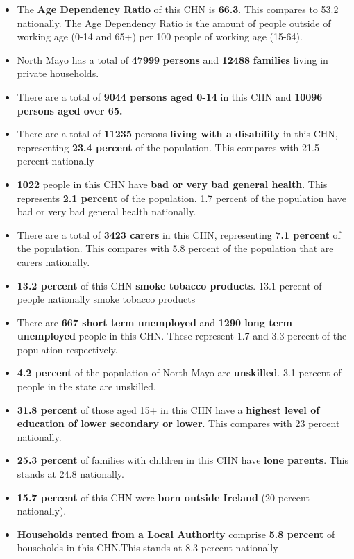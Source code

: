 \documentclass{article}
\begin{document}
\begin{itemize}

\item The \textbf{Age Dependency Ratio} of this CHN is  \textbf{66.3}. This compares to 53.2 nationally. The Age Dependency Ratio is the amount of people outside of working age (0-14 and 65+) per 100 people of working age (15-64). 

\item North Mayo has a total of \textbf{\num{47999}} \textbf{persons} and  \textbf{\num{12488}} \textbf{families} living in private households.

\item There are a total of \textbf{\num{9044} persons aged 0-14} in this CHN and \textbf{\num{10096} persons aged over 65.} 

\item There are a total of \textbf{\num{11235}} persons \textbf{living with a disability} in this CHN, representing \textbf{23.4 percent} of the population. This compares with  21.5 percent nationally

\item \textbf{\num{1022}} people in this CHN have \textbf{bad or very bad general health}. This represents \textbf{2.1 percent} of the population. 1.7 percent of the population have bad or very bad general health nationally. 

\item There are a total of \textbf{\num{3423} carers} in this CHN, representing \textbf{7.1 percent} of the population. This compares with 5.8 percent of the population that are carers nationally. 

\item \textbf{13.2 percent} of this CHN \textbf{smoke tobacco products}. 13.1 percent of people nationally smoke tobacco products

\item There are \textbf{\num{667} short term unemployed} and \textbf{\num{1290} long term unemployed} people in this CHN. These represent 1.7 and 3.3 percent of the population respectively.

\item  \textbf{4.2 percent} of the population of North Mayo are \textbf{unskilled}. 3.1 percent of people in the state are unskilled.

\item \textbf{31.8 percent} of those aged 15+ in this CHN have a \textbf{highest level of education of lower secondary or lower}. This compares with 23 percent nationally. 

\item \textbf{25.3 percent} of families with children in this CHN have \textbf{lone parents}. This stands at 24.8 nationally.

\item \textbf{15.7 percent} of this CHN were \textbf{born outside Ireland} (20 percent nationally).

\item \textbf{Households rented from a Local Authority} comprise \textbf{5.8 percent} of households in this CHN.This stands at 8.3 percent nationally

\end{itemize}
\end{document}
